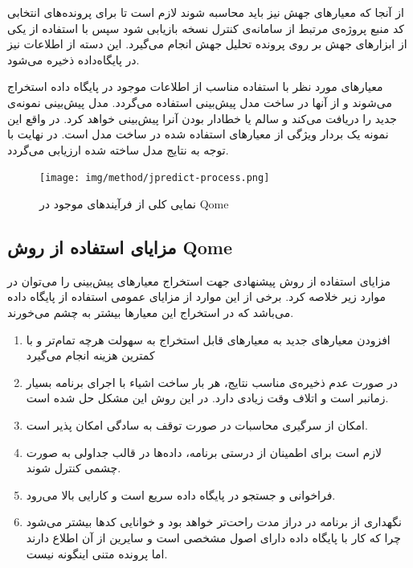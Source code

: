 از آنجا که معیارهای جهش نیز باید محاسبه شوند لازم است تا برای پرونده‌های انتخابی کد منبع پروژه‌ی  مرتبط از سامانه‌ی کنترل نسخه بازیابی شود سپس با استفاده از یکی از ابزارهای جهش بر روی  پرونده تحلیل جهش انجام می‌گیرد. این دسته از اطلاعات  نیز در پایگاه‌داده ذخیره می‌شود. 

معیارهای مورد نظر با استفاده  مناسب از اطلاعات موجود در پایگاه داده استخراج می‌شوند و از آنها در ساخت مدل پیش‌بینی استفاده می‌گردد. مدل پیش‌بینی نمونه‌ی جدید را دریافت می‌کند و سالم یا خطادار بودن آنرا پیش‌بینی خواهد کرد. در واقع این نمونه یک بردار ویژگی از معیارهای استفاده شده در ساخت مدل است. در نهایت  با توجه به نتایج مدل ساخته شده ارزیابی می‌گردد.

\begin{figure}[H]
	\centering
	\texttt{[image: img/method/jpredict-process.png]}
	\caption{ نمایی کلی از فرآیند‌های موجود در Qome}
	\label{fig:jpredict-process}
\end{figure}

\subsection{مزایای استفاده از روش Qome}
مزایای استفاده از روش پیشنهادی جهت استخراج معیارهای پیش‌بینی را می‌توان در موارد زیر خلاصه کرد. برخی از این موارد از مزایای عمومی استفاده از پایگاه داده می‌باشد که در استخراج این معیارها بیشتر به چشم می‌خورند.
\begin{enumerate}
\item افزودن معیارهای جدید به معیارهای قابل استخراج به سهولت هرچه تمام‌تر و با کمترین هزینه انجام می‌گیرد

\item	

در صورت عدم ذخیره‌ی مناسب نتایج، هر بار ساخت اشیاء با اجرای برنامه بسیار زمانبر است و اتلاف وقت زیادی دارد. در این روش این مشکل حل شده است.
\item 
امکان از سرگیری محاسبات در صورت توقف به سادگی امکان پذیر است.

\item
لازم است برای اطمینان از درستی برنامه، داده‌ها در قالب جداولی به صورت چشمی کنترل شوند.
\item
فراخوانی و جستجو در پایگاه داده سریع است و کارایی بالا می‌رود.
\item
نگهداری از برنامه در دراز مدت راحت‌تر خواهد بود و خوانایی کدها بیشتر می‌شود چرا که کار با پایگاه داده دارای اصول مشخصی است و سایرین از آن اطلاع دارند اما پرونده متنی اینگونه نیست.
\end{enumerate}

